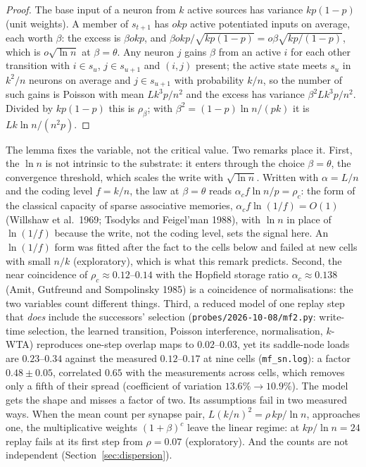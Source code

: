 \documentclass[11pt]{article}
\theoremstyle{definition}
\theoremstyle{plain}
\begin{document}
\begin{proof}
The base input of a neuron from $k$ active sources has variance $kp(1-p)$ (unit
weights). A member of $s_{t+1}$ has $okp$ active potentiated inputs on average,
each worth $\beta$: the excess is $\beta okp$, and $\beta okp/\sqrt{kp(1-p)} =
o\beta\sqrt{kp/(1-p)}$, which is $o\sqrt{\ln n}$ at $\beta=\theta$. Any neuron
$j$ gains $\beta$ from an active $i$ for each other transition with $i\in s_u$,
$j \in s_{u+1}$ and $(i,j)$ present; the active state meets $s_u$ in $k^2/n$
neurons on average and $j \in s_{u+1}$ with probability $k/n$, so the number of
such gains is Poisson with mean $Lk^3p/n^2$ and the excess has variance
$\beta^2 Lk^3p/n^2$. Divided by $kp(1-p)$ this is $\rho_\beta$; with $\beta^2 =
(1-p)\ln n/(pk)$ it is $Lk\ln n/(n^2p)$.
\end{proof}

The lemma fixes the variable, not the critical value. Two remarks place it.
First, the $\ln n$ is not intrinsic to the substrate: it enters through the
choice $\beta = \theta$, the convergence threshold, which scales the write
with $\sqrt{\ln n}$. Written with $\alpha = L/n$ and the coding level $f =
k/n$, the law at $\beta = \theta$ reads $\alpha_c f \ln n / p = \rho_c$: the form of
the classical capacity of sparse associative memories, $\alpha_c f\ln(1/f) =
O(1)$ (Willshaw et al.\ 1969; Tsodyks and Feigel'man 1988), with $\ln n$ in place
of $\ln(1/f)$ because the write, not the coding level, sets the signal here.
An $\ln(1/f)$ form was fitted after the fact to the cells below and failed at
new cells with small $n/k$ (exploratory), which is what this remark predicts.
Second, the near coincidence of $\rho_c \approx 0.12$--$0.14$ with the Hopfield
storage ratio $\alpha_c \approx 0.138$ (Amit, Gutfreund and Sompolinsky 1985) is
a coincidence of normalisations: the two variables count different things.
Third, a reduced model of one replay step that \emph{does} include the
successors' selection (\texttt{probes/2026-10-08/mf2.py}: write-time
selection, the learned transition, Poisson interference, normalisation,
$k$-WTA) reproduces one-step overlap maps to $0.02$--$0.03$, yet its saddle-node
loads are $0.23$--$0.34$ against the measured $0.12$--$0.17$ at nine cells
(\texttt{mf\_sn.log}): a factor $0.48 \pm 0.05$, correlated $0.65$ with the
measurements across cells, which removes only a fifth of their spread
(coefficient of variation $13.6\% \to 10.9\%$). The model gets the shape and
misses a factor of two.
Its assumptions fail in two measured ways. When the mean count per synapse pair, $L(k/n)^2 = \rho\,kp/\ln
n$, approaches one, the multiplicative weights $(1+\beta)^c$ leave the linear
regime: at $kp/\ln n = 24$ replay fails at its first step from $\rho = 0.07$
(exploratory). And the counts are not independent (Section~\ref{sec:dispersion}).
\end{document}
